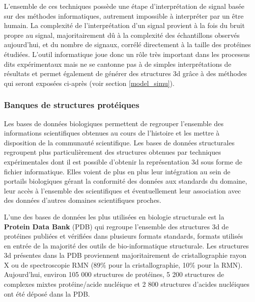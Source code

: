 L'ensemble de ces techniques possède une étape d'interprétation de signal basée sur des méthodes informatiques, autrement impossible à interpréter par un être humain. La complexité de l'interprétation d'un signal provient à la fois du bruit propre au signal, majoritairement dû à la complexité des échantillons observés aujourd'hui, et du nombre de signaux, corrélé directement à la taille des protéines étudiées. L'outil informatique joue donc un rôle très important dans les processus dits expérimentaux mais ne se cantonne pas à de simples interprétations de résultats et permet également de générer des structures 3d grâce à des méthodes qui seront exposées ci-après (voir section \ref{model_simu}).




\subsubsection{Banques de structures protéiques} \label{protein_DB}

Les bases de données biologiques permettent de regrouper l'ensemble des informations scientifiques obtenues au cours de l'histoire et les mettre à disposition de la communauté scientifique. Les bases de données structurales regroupent plus particulièrement des structures obtenues par techniques expérimentales dont il est possible d'obtenir la représentation 3d sous forme de fichier informatique. 
Elles voient de plus en plus leur intégration au sein de portails biologiques gérant la conformité des données aux standards du domaine, leur accès à l'ensemble des scientifiques et éventuellement leur association avec des données d'autres domaines scientifiques proches.

L'une des bases de données les plus utilisées en biologie structurale est la \textbf{Protein Data Bank} (PDB) \cite{berman_protein_2000} qui regroupe l'ensemble des structures 3d de protéines publiées et vérifiées dans plusieurs formats standards, formats utilisés en entrée de la majorité des outils de bio-informatique structurale. Les structures 3d présentes dans la PDB proviennent majoritairement de cristallographie rayon X ou de spectroscopie RMN (89\% pour la cristallographie, 10\% pour la RMN). Aujourd'hui, environ 105 000 structures de protéines, 5 200 structures de complexes mixtes protéine/acide nucléique et 2 800 structures d'acides nucléiques ont été déposé dans la PDB.

